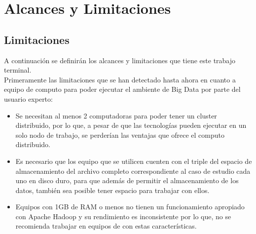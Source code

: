 \section{Alcances y Limitaciones}
\subsection{Limitaciones}
A continuación se definirán los alcances y limitaciones que tiene este trabajo terminal.
\\ 
Primeramente las limitaciones que se han detectado hasta ahora en cuanto a equipo de computo para poder ejecutar el ambiente de Big Data por parte del usuario experto:
\begin{itemize}
	\item Se necesitan al menos 2 computadoras para poder tener un cluster distribuido, por lo que, a pesar de que las tecnologías pueden ejecutar en un solo nodo de trabajo, se perderían las ventajas que ofrece el computo distribuido.
	\item Es necesario que los equipo que se utilicen cuenten con el triple del espacio de almacenamiento del archivo completo correspondiente al caso de estudio cada uno en disco duro, para que además de permitir el almacenamiento de los datos, también sea posible tener espacio para trabajar con ellos.
	\item Equipos con 1GB de RAM o menos no tienen un funcionamiento apropiado con Apache Hadoop y su rendimiento es inconsistente por lo que, no se recomienda trabajar en equipos de con estas características.  
\end{itemize}

